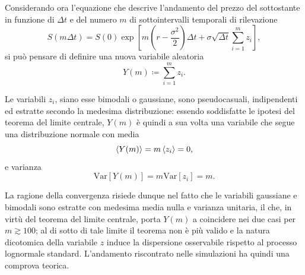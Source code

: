 Considerando ora l'equazione che descrive l'andamento del prezzo del sottostante in funzione di $\Delta t$ e del numero $m$ di sottointervalli temporali di rilevazione
\begin{equation}
    S(m \Delta t) = S(0) \exp{\left[m \left(r - \frac{\sigma^2}{2}\right) \Delta t + \sigma \sqrt{\Delta t} \displaystyle\sum_{i=1}^m z_i\right]},
    \label{eq:price(n)}
\end{equation}
si può pensare di definire una nuova variabile aleatoria
\begin{equation}
   Y(m) \coloneqq \displaystyle\sum_{i=1}^m z_i.
\end{equation}

Le variabili ${z_i}$, siano esse bimodali o gaussiane, sono  pseudocasuali, indipendenti ed estratte secondo la medesima distribuzione: essendo soddisfatte le ipotesi del teorema del limite centrale, $Y(m)$ è quindi a sua volta una variabile che segue una distribuzione normale con media
\begin{equation}
    \braket{Y(m)} = m\braket{z_i} = 0,
\end{equation}
e varianza
\begin{equation}
    \text{Var}[Y(m)] = m\text{Var}[z_i] = m.
\end{equation}

La ragione della convergenza risiede dunque nel fatto che le variabili gaussiane e bimodali sono estratte con medesima media nulla e varianza unitaria, il che, in virtù del teorema del limite centrale, porta $Y(m)$ a coincidere nei due casi per $m\gtrsim 100$; al di sotto di tale limite il teorema non è più valido e la natura dicotomica della variabile $z$ induce la dispersione osservabile rispetto al processo lognormale standard. L'andamento riscontrato nelle simulazioni ha quindi una comprova teorica.

